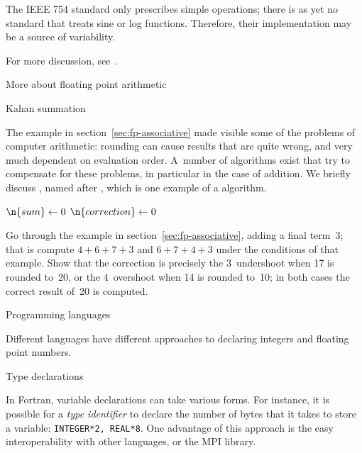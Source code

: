 The IEEE 754 standard only prescribes simple operations;
there is as yet no standard that treats sine or log functions.
Therefore, their implementation may be a source of variability.

For more discussion, see~\cite{Lionel:reproducibility}.


 {More about floating point arithmetic}

 {Kahan summation}

The example in section~\ref{sec:fp-associative} made visible some of
the problems of computer arithmetic: rounding can cause results that
are quite wrong, and very much dependent on evaluation order. A~number
of algorithms exist that try to compensate for these problems, in
particular in the case of addition. We briefly discuss
\cite{Kahan:1965:summation}, named after
, which is one example of a
 algorithm.

\begin{displayalgorithm}
  $\n{sum}\leftarrow0$\;
  $\n{correction}\leftarrow0$\;
\end{displayalgorithm}

\begin{exercise}
  \label{ex:kahan-sum}
  Go through the example in section~\ref{sec:fp-associative}, adding a
  final term~3; that is compute $4+6+7+3$ and $6+7+4+3$ under the
  conditions of that example.
  Show that the correction is precisely the $3$~undershoot when 17 is rounded
  to~20, or the $4$~overshoot when 14 is rounded to~10; in both cases
  the correct result of~20 is computed.
\end{exercise}

 {Programming languages}

Different languages have different approaches to declaring integers and
floating point numbers.

 {Type declarations}

In Fortran, variable declarations can take
various forms. For instance, it is possible for a
%
\emph{type identifier}
to declare the number of
bytes that it takes to store a variable: \texttt{INTEGER*2,
  REAL*8}. One advantage of this approach is the easy interoperability
with other languages, or the MPI library.

